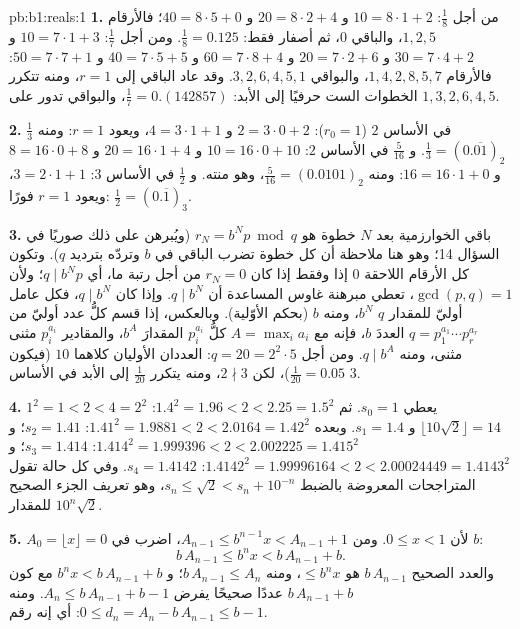 \begin{solution}{pb:b1:reals:1}
\textbf{1.} من أجل $\frac 18$: $10 = 8 \cdot 1 + 2$ و $20 = 8 \cdot 2
+ 4$ و $40 = 8 \cdot 5 + 0$؛ فالأرقام $1, 2, 5$، والباقي $0$، ثم
أصفار فقط: $\frac 18 = 0.125$. ومن أجل $\frac 17$: $10 = 7 \cdot 1 +
3$ و $30 = 7 \cdot 4 + 2$ و $20 = 7 \cdot 2 + 6$ و $60 = 7 \cdot 8 +
4$ و $40 = 7 \cdot 5 + 5$ و $50 = 7 \cdot 7 + 1$: فالأرقام $1, 4, 2,
8, 5, 7$، والبواقي $3, 2, 6, 4, 5, 1$. وقد عاد الباقي
إلى $r = 1$، ومنه تتكرر الخطوات الست حرفيًا إلى الأبد:
$\frac 17 = 0.(142857)$، والبواقي تدور على $1, 3, 2, 6,
4, 5$.

\textbf{2.} $\frac 13$ في الأساس $2$ ($r_0 = 1$): $2 = 3 \cdot 0 +
2$ و $4 = 3 \cdot 1 + 1$، ويعود $r = 1$: ومنه $\frac 13 =
(0.\overline{01})_2$. و $\frac{5}{16}$ في الأساس $2$: $10 = 16 \cdot
0 + 10$ و $20 = 16 \cdot 1 + 4$ و $8 = 16 \cdot 0 + 8$ و $16 = 16
\cdot 1 + 0$: ومنه $\frac{5}{16} = (0.0101)_2$، وهو منته. و $\frac 12$
في الأساس $3$: $3 = 2 \cdot 1 + 1$، ويعود $r = 1$ فورًا:
$\frac 12 = (0.\overline{1})_3$.

\textbf{3.} باقي الخوارزمية بعد $N$ خطوة هو $r_N =
b^N p \bmod q$ (ويُبرهن على ذلك صوريًا في السؤال 14؛ وهو هنا
ملاحظة أن كل خطوة تضرب الباقي في $b$
وتردّه بترديد $q$). وتكون كل الأرقام اللاحقة $0$ إذا وفقط إذا كان
$r_N = 0$ من أجل رتبة ما، أي $q \mid b^N p$؛ ولأن $\gcd(p, q) = 1$، تعطي مبرهنة غاوس
المساعدة أن $q \mid b^N$. وإذا كان $q \mid b^N$، فكل عامل أوليّ للمقدار
$q$  $b^N$، ومنه  $b$ (بحكم الأوّلية). وبالعكس، إذا قسم
كلُّ عدد أوليّ من $q = p_1^{a_1} \cdots p_r^{a_r}$ العددَ $b$، فإنه
مع $A = \max_i a_i$  كلُّ $p_i^{a_i}$ المقدارَ $b^A$، والمقادير
$p_i^{a_i}$  مثنى مثنى، ومنه $q \mid b^A$. ومن أجل $q = 20 =
2^2 \cdot 5$:  العددان الأوليان كلاهما $10$ (فيكون $\frac{1}{20} = 0.05$)،
لكن $2 \nmid 3$، ومنه يتكرر $\frac{1}{20}$ إلى الأبد في الأساس $3$.

\textbf{4.} $1^2 = 1 < 2 < 4 = 2^2$ يعطي $s_0 = 1$. ثم $1.4^2
= 1.96 < 2 < 2.25 = 1.5^2$: $\lfloor 10\sqrt 2 \rfloor = 14$ و
$s_1 = 1.4$. وبعده $1.41^2 = 1.9881 < 2 < 2.0164 = 1.42^2$: $s_2 =
1.41$؛ و $1.414^2 = 1.999396 < 2 < 2.002225 = 1.415^2$: $s_3 =
1.414$؛ و $1.4142^2 = 1.99996164 < 2 < 2.00024449 = 1.4143^2$: $s_4
= 1.4142$. وفي كل حالة تقول المتراجحات المعروضة بالضبط
$s_n \leq \sqrt 2 < s_n + 10^{-n}$، وهو تعريف
الجزء الصحيح للمقدار $10^n \sqrt 2$.

\textbf{5.} $A_0 = \lfloor x \rfloor = 0$ لأن $0 \leq x < 1$.
ومن $A_{n-1} \leq b^{n-1} x < A_{n-1} + 1$، اضرب في $b$:
\[
b\,A_{n-1} \leq b^n x < b\,A_{n-1} + b .
\]
والعدد الصحيح $b\,A_{n-1}$ هو $\leq b^n x$، ومنه $b\,A_{n-1} \leq
A_n$؛ و $b^n x < b\,A_{n-1} + b$ مع كون $b\,A_{n-1} + b$ عددًا
صحيحًا يفرض $A_n \leq b\,A_{n-1} + b - 1$. ومنه $0 \leq d_n =
A_n - b\,A_{n-1} \leq b - 1$: أي إنه رقم.


\end{solution}
